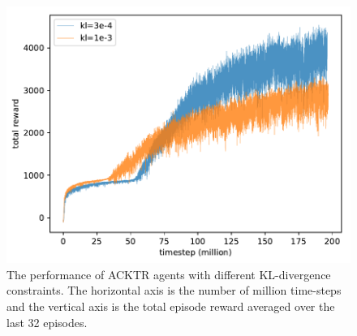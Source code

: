 \begin{figure}[!htbp]
	\includegraphics[width=\textwidth]{images/rec_180612_mix.pdf}
	\centering
	\caption{The performance of ACKTR agents with different KL-divergence constraints. The horizontal axis is the number of million time-steps and the vertical axis is the total episode reward averaged over the last 32 episodes.}\label{rec_mix}
\end{figure}
